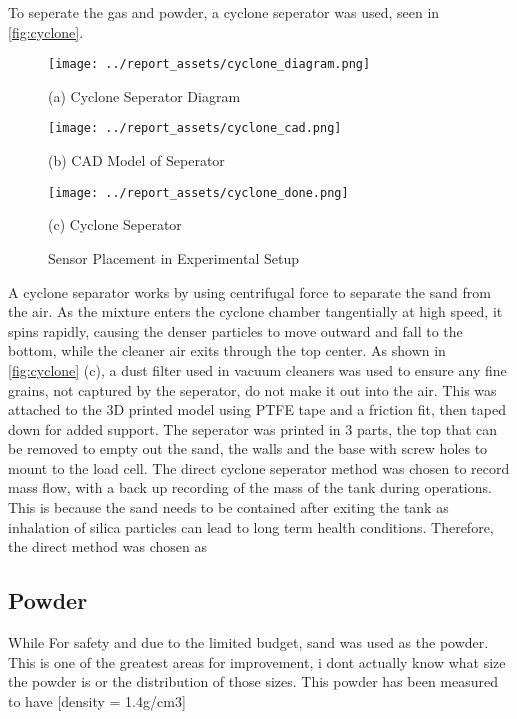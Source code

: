 To seperate the gas and powder, a cyclone seperator was used, seen in \autoref{fig:cyclone}.
\begin{figure}[htbp]
    \centering

    \begin{minipage}{0.3\textwidth}
        \centering
        \texttt{[image: ../report\_assets/cyclone\_diagram.png]}
        \caption*{(a) Cyclone Seperator Diagram}
    \end{minipage}
    \hfill
    \begin{minipage}{0.3\textwidth}
        \centering
        \texttt{[image: ../report\_assets/cyclone\_cad.png]}
        \caption*{(b) CAD Model of Seperator}
    \end{minipage}
    \hfill
    \begin{minipage}{0.3\textwidth}
        \centering
        \texttt{[image: ../report\_assets/cyclone\_done.png]}
        \caption*{(c) Cyclone Seperator}
    \end{minipage}
    \caption{Sensor Placement in Experimental Setup}\label{fig:cyclone}
\end{figure}
A cyclone separator works by using centrifugal force to separate the sand from the air. As the mixture enters the cyclone chamber tangentially at high speed, it spins rapidly, causing the denser particles to move outward and fall to the bottom, while the cleaner air exits through the top center. As shown in \autoref{fig:cyclone} (c), a dust filter used in vacuum cleaners was used to ensure any fine grains, not captured by the seperator, do not make it out into the air. This was attached to the 3D printed model using PTFE tape and a friction fit, then taped down for added support. The seperator was printed in 3 parts, the top that can be removed to empty out the sand, the walls and the base with screw holes to mount to the load cell.
The direct cyclone seperator method was chosen to record mass flow, with a back up recording of the mass of the tank during operations. This is because the sand needs to be contained after exiting the tank as inhalation of silica particles can lead to long term health conditions. Therefore, the direct method was chosen as

\subsection{Powder}
While 
For safety and due to the limited budget, sand was used as the powder. This is one of the greatest areas for improvement, i dont actually know what size the powder is or the distribution of those sizes. This powder has been measured to have [density = 1.4g/cm3]

